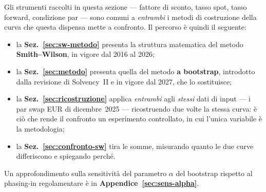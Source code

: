 \documentclass[11pt,a4paper]{article}
\theoremstyle{plain}
\theoremstyle{definition}
\theoremstyle{remark}
\begin{document}
\begin{keybox}
Gli strumenti raccolti in questa sezione --- fattore di sconto, tasso spot, tasso forward,
condizione par --- sono comuni a \emph{entrambi} i metodi di costruzione della curva che
questa dispensa mette a confronto. Il percorso \`e quindi il seguente:
\begin{itemize}
  \item la \textbf{Sez.~\ref{sec:sw-metodo}} presenta la struttura matematica del metodo
        \textbf{Smith--Wilson}, in vigore dal 2016 al 2026;
  \item la \textbf{Sez.~\ref{sec:metodo}} presenta quella del metodo \textbf{a bootstrap},
        introdotto dalla revisione di Solvency~II e in vigore dal 2027, che lo sostituisce;
  \item la \textbf{Sez.~\ref{sec:ricostruzione}} applica \emph{entrambi} agli \emph{stessi}
        dati di input --- i par swap EUR di dicembre~2025 --- ricostruendo due volte la stessa
        curva: \`e ci\`o che rende il confronto un esperimento controllato, in cui l'unica
        variabile \`e la metodologia;
  \item la \textbf{Sez.~\ref{sec:confronto-sw}} tira le somme, misurando quanto le due curve
        differiscono e spiegando perch\'e.
\end{itemize}
Un approfondimento sulla sensitivit\`a del parametro $\alpha$ del bootstrap rispetto al
phasing-in regolamentare \`e in \textbf{Appendice~\ref{sec:sens-alpha}}.
\end{keybox}
\end{document}
